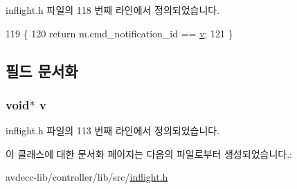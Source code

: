 inflight.\+h 파일의 118 번째 라인에서 정의되었습니다.


\begin{DoxyCode}
119     \{
120         \textcolor{keywordflow}{return} m.cmd\_notification\_id == \hyperlink{classavdecc__lib_1_1_notification_comp_a67806b49e20fb1170422969965db6ecb}{v};
121     \}
\end{DoxyCode}


\subsection{필드 문서화}
\subsubsection[{\texorpdfstring{v}{v}}]{\setlength{\rightskip}{0pt plus 5cm}void$\ast$ v\hspace{0.3cm}{\ttfamily [private]}}\hypertarget{classavdecc__lib_1_1_notification_comp_a67806b49e20fb1170422969965db6ecb}{}\label{classavdecc__lib_1_1_notification_comp_a67806b49e20fb1170422969965db6ecb}


inflight.\+h 파일의 113 번째 라인에서 정의되었습니다.



이 클래스에 대한 문서화 페이지는 다음의 파일로부터 생성되었습니다.\+:\begin{DoxyCompactItemize}
\item 
avdecc-\/lib/controller/lib/src/\hyperlink{inflight_8h}{inflight.\+h}\end{DoxyCompactItemize}
